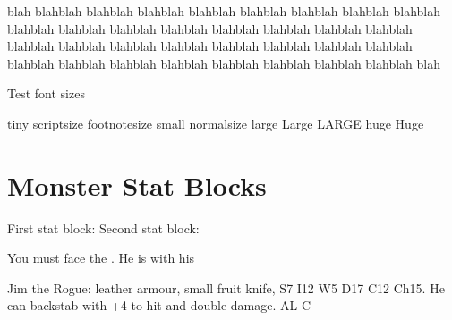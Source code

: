 \documentclass[a4paper,serif]{module}       %
\begin{document}
blah blahblah blahblah blahblah blahblah blahblah blahblah blahblah blahblah blahblah blahblah blahblah blahblah blahblah blahblah blahblah blahblah blahblah blahblah blahblah blahblah blahblah blahblah blahblah blahblah blahblah blahblah blahblah blahblah blahblah blahblah blahblah blahblah blah                                 


%
%
%
%

Test font sizes

{\tiny tiny}
{\scriptsize scriptsize}
{\footnotesize footnotesize}
{\small small}
{\normalsize normalsize}
{\large large}
{\Large Large}
{\LARGE LARGE}
{\huge huge}
{\Huge Huge}

\section{Monster Stat Blocks}


First stat block:
Second stat block:

You must face the . 
He is with his 




\begin{statblockfreestyle}
Jim the Rogue: leather armour, small fruit knife, S7 I12 W5 D17 C12 Ch15. He can backstab with +4 to hit and double damage. AL C
\end{statblockfreestyle}
\end{document}
